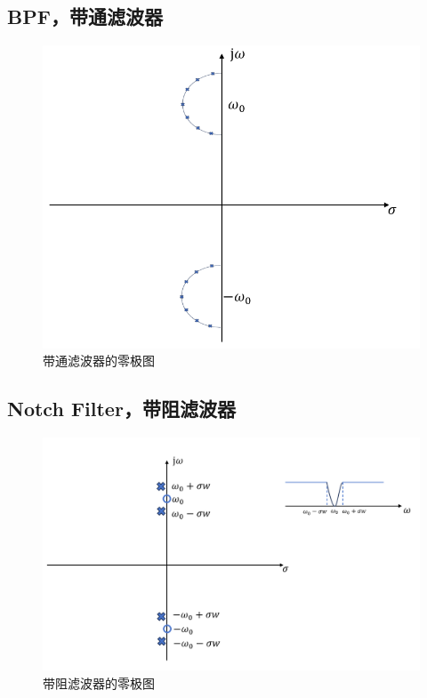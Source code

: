 \documentclass[UTF8]{ctexart}
\begin{document}
\subsection{BPF，带通滤波器}
\begin{figure}[h]
    \centering         %
    \includegraphics[scale=0.45]{4.png}
    \caption{带通滤波器的零极图}
\end{figure}
\subsection{Notch Filter，带阻滤波器}
\begin{figure}[h]
    \centering         %
    \includegraphics[scale=0.45]{5.png}
    \caption{带阻滤波器的零极图}
\end{figure}
\end{document}
